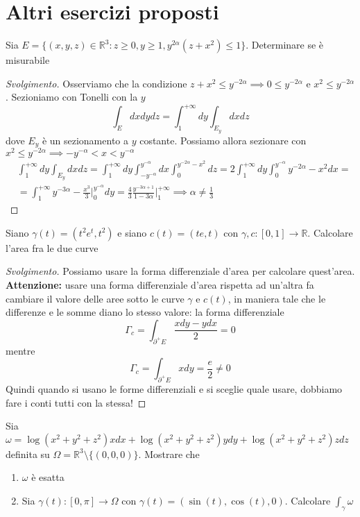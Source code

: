\chapter{Altri esercizi proposti}
\pagestyle{plain}
\thispagestyle{empty}
\pagestyle{fancy}
\begin{exercise}
	Sia $E=\{(x, y, z) \in \mathbb{R}^3 : z \geq 0, y \geq 1, y^{2 \alpha}(z + x^2) \leq 1 \}$. Determinare se è misurabile
\end{exercise}
\begin{proof}[Svolgimento]
	Osserviamo che la condizione $z + x^2 \leq y^{-2 \alpha} \implies 0 \leq y^{-2\alpha}$ e $x^2 \leq y^{-2 \alpha}$. Sezioniamo con Tonelli con la $y$
	$$
	\int_E dxdydz = \int_1^{+\infty} dy \int_{E_y} dxdz
	$$
	dove $E_y$ è un sezionamento a $y$ costante. Possiamo allora sezionare con $x^2 \leq y^{-2\alpha} \implies -y^{-\alpha} < x < y^{-\alpha}$
	\begin{align*}
	&\int_1^{+\infty} dy \int_{E_y} dxdz = \int_1^{+\infty} dy \int_{-y^{-\alpha}}^{y^{-\alpha}} dx \int_0^{y^{-2 \alpha} - x^2} dz = 2 \int_1^{+\infty} dy \int_0^{y^{-\alpha}} y^{-2 \alpha} - x^2 dx = \\
	&=\int_1^{+\infty} y^{-3 \alpha} - \frac{x^3}{3}\Bigg|_0^{y^{-\alpha}} dy = \frac{4}{3} \frac{y^{-3\alpha + 1}}{1 - 3 \alpha}\Bigg|_1^{+\infty} \implies \alpha \neq \frac{1}{3}
	\end{align*}
\end{proof}
\begin{exercise}
Siano $\gamma(t)=(t^2 e^t, t^2)$ e siano $c(t)=(te, t)$ con $\gamma, c:[0,1] \to \mathbb{R}$. Calcolare l'area fra le due curve
\end{exercise}
\begin{proof}[Svolgimento]
	Possiamo usare la forma differenziale d'area per calcolare quest'area. \textbf{Attenzione:} usare una forma differenziale d'area rispetta ad un'altra fa cambiare il valore delle aree sotto le curve $\gamma$ e $c(t)$, in maniera tale che le differenze e le somme diano lo stesso valore: la forma differenziale
	$$
	\Gamma_c = \int_{\partial^{+} E} \frac{xdy - ydx}{2} = 0
	$$
	mentre
	$$
	\Gamma_c = \int_{\partial^{+} E} xdy = \frac{e}{2} \neq 0
	$$
	Quindi quando si usano le forme differenziali e si sceglie quale usare, dobbiamo fare i conti tutti con la stessa!
\end{proof}
\begin{exercise}
	Sia $\omega = \log(x^2 + y^2 + z^2)xdx + \log(x^2+y^2+z^2)ydy + \log(x^2+y^2+z^2)zdz$ definita su $\Omega = \mathbb{R}^3 \setminus \{(0, 0, 0)\}$. Mostrare che 
	\begin{enumerate}
		\item $\omega$ è esatta
		\item Sia $\gamma(t) : [0, \pi] \to \Omega$ con $\gamma(t) = (\sin(t), \cos(t), 0)$. Calcolare $\int_{\gamma} \omega$
	\end{enumerate}
\end{exercise}
\cleardoublepage